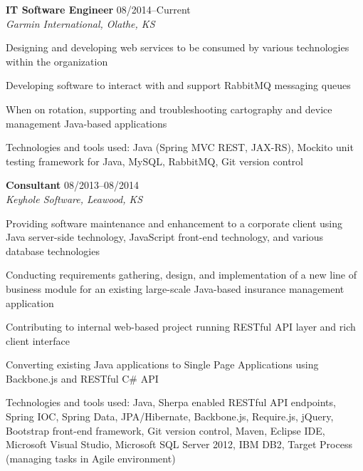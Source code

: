 \begin{itemize1}
	\item \textbf{IT Software Engineer} \textopenbullet{} 08/2014--Current \\
		\textit{Garmin International, Olathe, KS} \vspace{-1.5mm}
		\begin{itemize1}
			\item Designing and developing web services to be consumed by various technologies within the organization
			\item Developing software to interact with and support RabbitMQ messaging queues 
			\item When on rotation, supporting and troubleshooting cartography and device management Java-based applications
			\item Technologies and tools used: Java (Spring MVC REST, JAX-RS), Mockito unit testing framework for Java, MySQL, RabbitMQ, Git version control
		\end{itemize1}
\end{itemize1}

\begin{itemize1}
	\item \textbf{Consultant} \textopenbullet{} 08/2013--08/2014 \\
		\textit{Keyhole Software, Leawood, KS} \vspace{-1.5mm}
		\begin{itemize1}
			\item Providing software maintenance and enhancement to a corporate client using Java server-side technology, JavaScript front-end technology, and various database technologies
			\item Conducting requirements gathering, design, and implementation of a new line of business module for an existing large-scale Java-based insurance management application
			\item Contributing to internal web-based project running RESTful API layer and rich client interface
			\item Converting existing Java applications to Single Page Applications using Backbone.js and RESTful C\# API
			\item Technologies and tools used: Java, Sherpa enabled RESTful API endpoints, Spring IOC, Spring Data, JPA/Hibernate, Backbone.js, Require.js, jQuery, Bootstrap front-end framework, Git version control, Maven, Eclipse IDE, Microsoft Visual Studio, Microsoft SQL Server 2012, IBM DB2, Target Process (managing tasks in Agile environment)
		\end{itemize1}
\end{itemize1}


